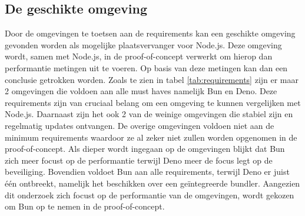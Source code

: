 \subsection{De geschikte omgeving}
Door de omgevingen te toetsen aan de requirements kan een geschikte 
omgeving gevonden worden als mogelijke plaatsvervanger voor Node.js.
Deze omgeving wordt, samen met Node.js, in de proof-of-concept verwerkt om hierop dan performantie metingen uit te voeren.
Op basis van deze metingen kan dan een conclusie getrokken worden.
Zoals te zien in tabel \ref{tab:requirements} zijn er maar 2 omgevingen die voldoen aan alle must haves namelijk Bun en Deno. 
Deze requirements zijn van cruciaal belang om een omgeving te kunnen vergelijken met Node.js. 
Daarnaast zijn het ook 2 van de weinige omgevingen die stabiel zijn en regelmatig updates ontvangen. 
De overige omgevingen voldoen niet aan de minimum requirements waardoor ze al zeker niet zullen worden opgenomen in de proof-of-concept.
Als dieper wordt ingegaan op de omgevingen blijkt dat Bun zich meer focust op de performantie terwijl Deno meer de focus legt op de beveiliging.
Bovendien voldoet Bun aan alle requirements, terwijl Deno er juist één ontbreekt, namelijk het beschikken over een geïntegreerde bundler. 
Aangezien dit onderzoek zich focust op de performantie van de omgevingen, wordt gekozen om Bun op te nemen in de proof-of-concept.